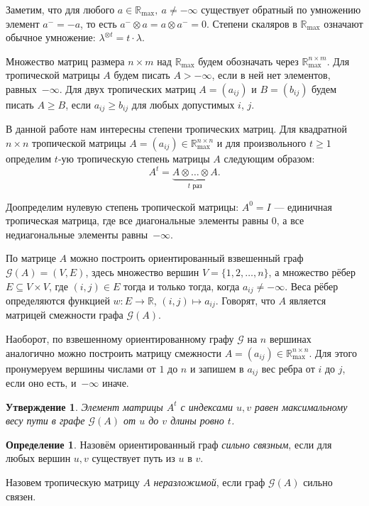 \documentclass[12pt]{article}
\newtheorem{proposition}[theorem]{Утверждение}
\theoremstyle{definition}
\newtheorem{definition}[theorem]{Определение}
\begin{document}
Заметим, что для любого $a \in \mathbb{R}_{\max}, \ a \ne -\infty$ существует обратный по умножению элемент $a^- = -a$, то есть $a^- \otimes a = a \otimes a^- = 0$. Степени скаляров в $\mathbb{R}_{\max}$ означают обычное умножение: $\lambda^{\otimes t} = t \cdot \lambda$.

Множество матриц размера $n \times m$ над $\mathbb{R}_{\max}$ будем обозначать через $\mathbb{R}_{\max}^{n \times m}$. Для тропической матрицы $A$ будем писать $A > -\infty$, если в ней нет элементов, равных~$-\infty$. Для двух тропических матриц $A = (a_{ij})$ и $B = (b_{ij})$ будем писать $A \ge B$, если $a_{ij} \ge b_{ij}$ для любых допустимых $i$, $j$.

В данной работе нам интересны степени тропических матриц. Для квадратной $n \times n$ тропической матрицы $A = (a_{ij}) \in \mathbb{R}_{\max}^{n \times n}$ и для произвольного $t \ge 1$ определим $t$-ую тропическую степень матрицы $A$ следующим образом: \begin{equation*}
A^t = \underbrace{A \otimes \dots \otimes A}_{t \text{ раз}}.
\end{equation*}

Доопределим нулевую степень тропической матрицы: $A^0 = I$ --- единичная тропическая матрица, где все диагональные элементы равны $0$, а все недиагональные элементы равны~$-\infty$.

По матрице $A$ можно построить ориентированный взвешенный граф $\mathcal{G}(A) = (V, E)$, здесь множество вершин $V = \{ 1, 2, \dots, n\}$, а множество рёбер $E \subseteq V \times V$, где $(i, j) \in E$ тогда и только тогда, когда $a_{ij} \ne -\infty$. Веса рёбер определяются функцией $w : E \rightarrow \mathbb{R}$, $(i, j) \mapsto a_{ij}$. Говорят, что $A$ является матрицей смежности графа $\mathcal{G}(A)$.

Наоборот, по взвешенному ориентированному графу $\mathcal{G}$ на $n$ вершинах аналогично можно построить матрицу смежности $A = (a_{ij}) \in \mathbb{R}_{\max}^{n \times n}$. Для этого пронумеруем вершины числами от $1$ до $n$ и запишем в $a_{ij}$ вес ребра от $i$ до $j$, если оно есть, и~$-\infty$ иначе.

\begin{proposition} \cite[равенство (9)]{bounds}
\label{entriesInPower}
Элемент матрицы $A^t$ с индексами $u, v$ равен максимальному весу пути в графе $\mathcal{G}(A)$ от $u$ до $v$ длины ровно $t$.
\end{proposition}

\begin{definition}
Назовём ориентированный граф \textit{сильно связным}, если для любых вершин $u, v$ существует путь из $u$ в $v$.

Назовем тропическую матрицу $A$ \textit{неразложимой}, если граф $\mathcal{G}(A)$ сильно связен.
\end{definition}
\end{document}

